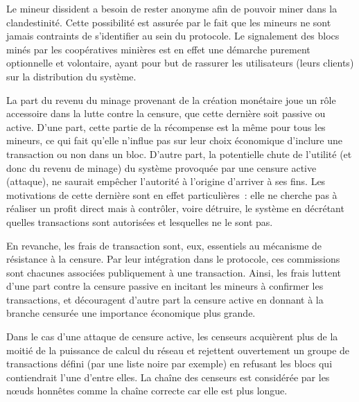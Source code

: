 Le mineur dissident a besoin de rester anonyme afin de pouvoir miner dans la clandestinité. Cette possibilité est assurée par le fait que les mineurs ne sont jamais contraints de s'identifier au sein du protocole. Le signalement des blocs minés par les coopératives minières est en effet une démarche purement optionnelle et volontaire, ayant pour but de rassurer les utilisateurs (leurs clients) sur la distribution du système.

La part du revenu du minage provenant de la création monétaire joue un rôle accessoire dans la lutte contre la censure, que cette dernière soit passive ou active. D'une part, cette partie de la récompense est la même pour tous les mineurs, ce qui fait qu'elle n'influe pas sur leur choix économique d'inclure une transaction ou non dans un bloc. D'autre part, la potentielle chute de l'utilité (et donc du revenu de minage) du système provoquée par une censure active (attaque), ne saurait empêcher l'autorité à l'origine d'arriver à ses fins. Les motivations de cette dernière sont en effet particulières~: elle ne cherche pas à réaliser un profit direct mais à contrôler, voire détruire, le système en décrétant quelles transactions sont autorisées et lesquelles ne le sont pas.

En revanche, les frais de transaction sont, eux, essentiels au mécanisme de résistance à la censure. Par leur intégration dans le protocole, ces commissions sont chacunes associées publiquement à une transaction. Ainsi, les frais luttent d'une part contre la censure passive en incitant les mineurs à confirmer les transactions, et découragent d'autre part la censure active en donnant à la branche censurée une importance économique plus grande.


Dans le cas d'une attaque de censure active, les censeurs acquièrent plus de la moitié de la puissance de calcul du réseau et rejettent ouvertement un groupe de transactions défini (par une liste noire par exemple) en refusant les blocs qui contiendrait l'une d'entre elles. La chaîne des censeurs est considérée par les nœuds honnêtes comme la chaîne correcte car elle est plus longue.

